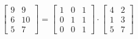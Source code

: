 \documentclass{article}
\begin{document}
\[
	\begin{bmatrix}
		9 & 9  \\
		6 & 10 \\
		5 & 7
	\end{bmatrix}
	=
	\begin{bmatrix}
		1 & 0 & 1 \\
		0 & 1 & 1 \\
		0 & 0 & 1
	\end{bmatrix}
	\cdot
	\begin{bmatrix}
		4 & 2 \\
		1 & 3 \\
		5 & 7
	\end{bmatrix}
\]
\end{document}
